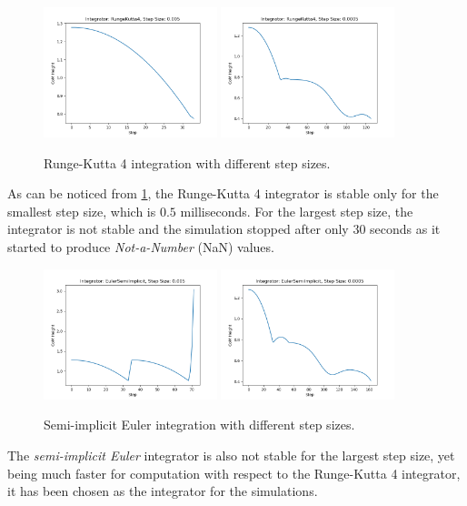 \begin{figure}[h]
    \centering
    \caption{Runge-Kutta 4 integration with different step sizes.}
    \label{fig:rk4}
    \includegraphics[width=0.45\textwidth]{Images/rk4_5ms.png}
    \includegraphics[width=0.45\textwidth]{Images/rk4_05ms.png}
\end{figure}

As can be noticed from \cref{fig:rk4}, the Runge-Kutta 4 integrator is stable only for the smallest step size, which is $0.5$ milliseconds. For the largest step size, the integrator is not stable and the simulation stopped after only $30$ seconds as it started to produce \textit{Not-a-Number} (NaN) values.

\begin{figure}[h]
    \centering
    \caption{Semi-implicit Euler integration with different step sizes.}
    \label{fig:sie}
    \includegraphics[width=0.45\textwidth]{Images/sie_5ms.png}
    \includegraphics[width=0.45\textwidth]{Images/sie_05ms.png}
\end{figure}

The \textit{semi-implicit Euler} integrator is also not stable for the largest step size, yet being much faster for computation with respect to the Runge-Kutta 4 integrator, it has been chosen as the integrator for the simulations.